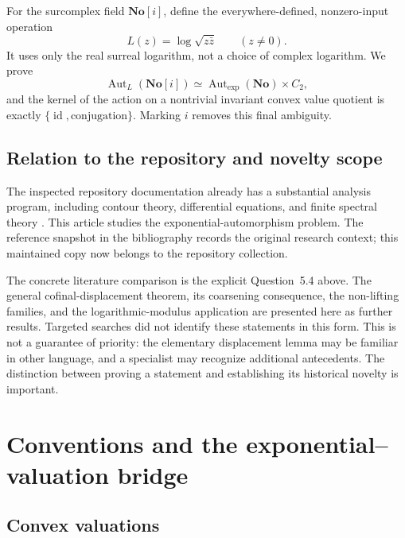 \documentclass[11pt]{article}
\theoremstyle{definition}
\theoremstyle{remark}
\newcommand{\No}{\mathbf{No}}
\newcommand{\id}{\operatorname{id}}
\newcommand{\Gexp}{\operatorname{Aut}_{\exp}}
\newcommand{\GLmod}{\operatorname{Aut}_{L}}
\numberwithin{equation}{section}
\begin{document}
For the surcomplex field $\No[i]$, define the everywhere-defined, nonzero-input
operation
\[
 L(z)=\log\sqrt{z\bar z}\qquad(z\ne0).
\]
It uses only the real surreal logarithm, not a choice of complex logarithm.
We prove
\begin{equation}\label{eq:main-complex}
 \GLmod(\No[i])\simeq\Gexp(\No)\times C_2,
\end{equation}
and the kernel of the action on a nontrivial invariant convex value quotient
is exactly $\{\id,\text{conjugation}\}$. Marking $i$ removes this final ambiguity.

\subsection{Relation to the repository and novelty scope}

The inspected repository documentation already has a substantial analysis
program, including contour theory, differential equations, and finite spectral
theory \cite{Repo}. This article studies the exponential-automorphism problem.
The reference snapshot in the bibliography records the original research
context; this maintained copy now belongs to the repository collection.

The concrete literature comparison is the explicit Question~5.4 above.
The general cofinal-displacement theorem, its coarsening consequence, the
non-lifting families, and the logarithmic-modulus application are presented
here as further results. Targeted searches did not identify these statements
in this form. This is not a guarantee of priority: the elementary displacement
lemma may be familiar in other language, and a specialist may recognize
additional antecedents. The distinction between proving a statement and
establishing its historical novelty is important.

\section{Conventions and the exponential--valuation bridge}

\subsection{Convex valuations}
\end{document}
